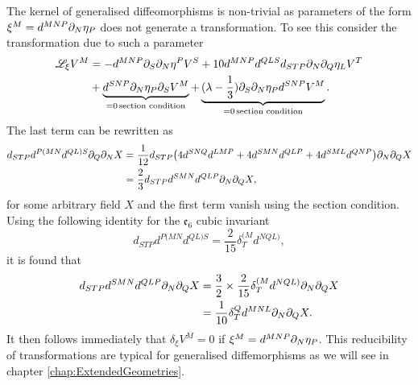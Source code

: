 The kernel of generalised diffeomorphisms is non-trivial as parameters of the form $\xi^M=d^{MNP}\partial_N \eta_P$ does not generate a transformation. To see this consider the transformation due to such a parameter
\begin{equation}
    \begin{aligned}
    \mathscr{L}_\xi V^M &=-d^{MNP}\partial_S\partial_N\eta^PV^S+10d^{MNP}d^{QLS}d_{STP}\partial_N\partial_Q\eta_LV^T\\
    &+\underbrace{d^{SNP}\partial_N\eta_P\partial_SV^M}_{=0\,\text{section condition}}+\underbrace{(\lambda-\frac{1}{3})\partial_S\partial_N\eta_Pd^{SNP}V^M}_{=0\,\text{section condition}}.
    \end{aligned}
\end{equation}
The last term can be rewritten as 
\begin{equation}
    \begin{aligned}
    d_{STP}d^{P(MN}d^{QL)S}\partial_Q\partial_N X &= \frac{1}{12}d_{STP}\big(4d^{SNQ}d^{LMP}+4d^{SMN}d^{QLP}+4d^{SML}d^{QNP}\big)\partial_N\partial_QX\\
    &= \frac{2}{3}d_{STP}d^{SMN}d^{QLP}\partial_N\partial_QX,
    \end{aligned}
\end{equation}
for some arbitrary field $X$ and the first term vanish using the section condition. Using the following identity for the $\mathfrak{e}_6$ cubic invariant 
\begin{equation}\label{eq:E6Identity}
d_{STP}d^{P(MN}d^{QL)S}=\frac{2}{15}\delta_T^{(M}d^{NQL)}, 
\end{equation}
it is found that 
\begin{equation}
    \begin{aligned}
    d_{STP}d^{SMN}d^{QLP}\partial_N\partial_QX &= \frac{3}{2}\times\frac{2}{15}\delta_T^{(M}d^{NQL)}\partial_N\partial_QX\\
    &= \frac{1}{10}\delta^Q_Td^{MNL}\partial_N\partial_QX.
    \end{aligned}
\end{equation}
It then follows immediately that $\delta_\xi V^M=0$ if $\xi^M=d^{MNP}\partial_N\eta_P$. This reducibility of transformations are typical for generalised diffemorphisms as we will see in chapter \ref{chap:ExtendedGeometries}. 

